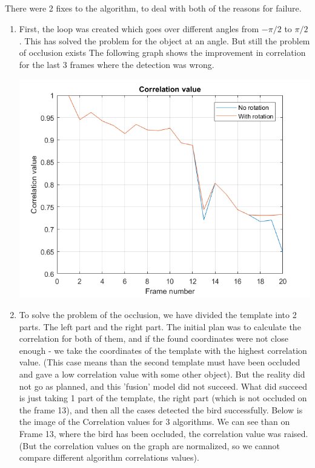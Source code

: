\documentclass[a4paper]{iacas}
\begin{document}
\subsection{}
There were 2 fixes to the algorithm, to deal with both of the reasons for failure. 
\begin{enumerate}
\item First, the loop was created which goes over different angles from $-\pi/2$ to $\pi/2$. This has solved the problem for the object at an angle. But still the problem of occlusion exists
The following graph shows the improvement in correlation for the last 3 frames where the detection was wrong.
\vskip 0.1in
\begin{minipage}{0.5\textwidth}
\centering
	\includegraphics[scale=0.8]{output/q4/algo_2/corr.png}
\end{minipage}
\vskip 0.1in

\item To solve the problem of the occlusion, we have divided the template into 2 parts. The left part and the right part. The initial plan was to calculate the correlation for both of them, and if the found coordinates were not close enough - we take the coordinates of the template with the highest correlation value. (This case means than the second template must have been occluded and gave a low correlation value with some other object). But the reality did not go as planned, and this 'fusion' model did not succeed. What did succeed is just taking 1 part of the template, the right part (which is not occluded on the frame 13), and then all the cases detected the bird successfully. Below is the image of the Correlation values for 3 algorithms. We can see than on Frame 13, where the bird has been occluded, the correlation value was raised. (But the correlation values on the graph are normalized, so we cannot compare different algorithm correlations values).


\end{enumerate}
\end{document}
